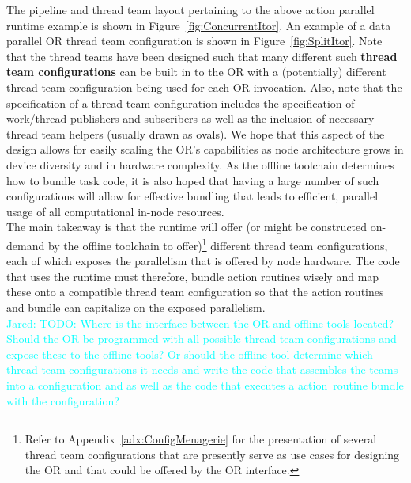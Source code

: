 \documentclass{article}
\newcommand{\Jared}[1]          {\textcolor{cyan}{Jared: #1}}
\newcommand{\shortOR}   {OR\xspace}
\newcommand{\OR}        {\shortOR}
\newcommand{\qsaa}                   {action\ }                 %
\newcommand{\actionroutinebundle}  {\qsaa routine bundle\xspace}  %
\begin{document}
The pipeline and thread team layout pertaining to the above action parallel
runtime example is shown in Figure~\ref{fig:ConcurrentItor}.  An example of a
data parallel \OR thread team configuration is shown in
Figure~\ref{fig:SplitItor}.  Note that the thread teams have been designed such
that many different such \textbf{thread team configurations} can be built in to the
\OR with a (potentially) different thread team configuration being used for each
\OR invocation.  Also, note that the specification of a thread team configuration includes the
specification of work/thread publishers and subscribers as well as the inclusion
of necessary thread team helpers (usually drawn as ovals).  We hope that this
aspect of the design allows for easily scaling the \OR's capabilities as
node architecture grows in device diversity and in hardware complexity.  As the
offline toolchain determines how to bundle task code, it is also hoped that having a
large number of such configurations will allow for effective bundling that leads
to efficient, parallel usage of all computational in-node resources.\\

The main takeaway is that the runtime will offer (or might be constructed
on-demand by the offline toolchain to offer)\footnote{Refer to
Appendix~\ref{adx:ConfigMenagerie} for the presentation of several thread team
configurations that are presently serve as use cases for designing the \OR and
that could be offered by the \OR interface.} different thread team
configurations, each of which exposes the parallelism that is offered by node
hardware.  The code that uses the runtime must therefore, bundle action routines
wisely and map these onto a compatible thread team configuration so that the
action routines and bundle can capitalize on the exposed parallelism.\\

\Jared{TODO: Where is the interface between the \OR and offline tools
located?  Should the \OR be programmed with all possible thread team
configurations and expose these to the offline tools?  Or should the offline
tool determine which thread team configurations it needs and write the code that
assembles the teams into a configuration and as well as the code that executes a
\actionroutinebundle with the configuration?}\\
\end{document}
